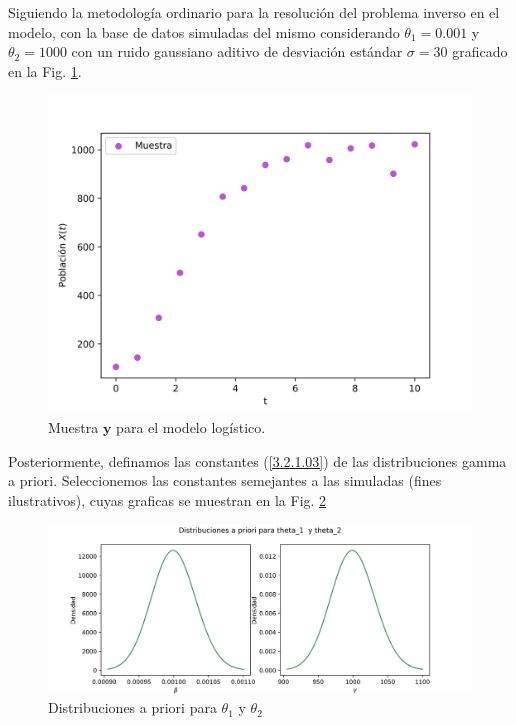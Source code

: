 Siguiendo la metodología ordinario para la resolución del problema inverso en el modelo, con la base de datos simuladas del mismo considerando $\theta_1 = 0.001$ y $\theta_2 = 1000$ con un ruido gaussiano aditivo de desviación estándar $\sigma = 30$ graficado en la Fig. \ref{Fig. 3.2.log.muestra}.

\begin{figure}[H] 
    \centering 
    \includegraphics[width = 10 cm ]{img/Exp_Central_logistico_sigma/Figuras/Generales/Muestra_logistico_sigma.png} 
    \caption{Muestra $\mathbf{y}$ para el modelo logístico.}
    \label{Fig. 3.2.log.muestra}
\end{figure} 

Posteriormente, definamos las constantes (\ref{3.2.1.03}) de las distribuciones gamma a priori. Seleccionemos las constantes semejantes a las simuladas (fines ilustrativos), cuyas graficas se muestran en la Fig. \ref{Fig. 3.2.log.priori}

\begin{figure} 
    \centering 
    \includegraphics[width = 15 cm]{img/Exp_Central_logistico_sigma/Figuras/Generales/Apriori_logistico_sigma.png}     
    \caption{Distribuciones a priori para $\theta_1$ y $\theta_2$}
    \label{Fig. 3.2.log.priori}
\end{figure} 

